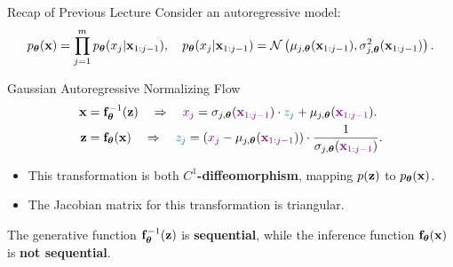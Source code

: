 \documentclass{beamer}
\begin{document}
\begin{frame}{Recap of Previous Lecture}
	Consider an autoregressive model:
	\vspace{-0.3cm}
	{\small
		\[
		p_{\boldsymbol{\theta}}(\mathbf{x}) = \prod_{j=1}^m p_{\boldsymbol{\theta}}(x_j | \mathbf{x}_{1:j - 1}), \quad
		p_{\boldsymbol{\theta}}(x_j | \mathbf{x}_{1:j - 1}) = \mathcal{N} \left(\mu_{j, \boldsymbol{\theta}}(\mathbf{x}_{1:j-1}), \sigma^2_{j, \boldsymbol{\theta}} (\mathbf{x}_{1:j-1})\right).
		\]
	}
	\vspace{-0.5cm}
	\begin{block}{Gaussian Autoregressive Normalizing Flow}
		\vspace{-0.5cm}
		\begin{align*}
			\mathbf{x} &= \mathbf{f}^{-1}_{\boldsymbol{\theta}}(\mathbf{z}) \quad \Rightarrow \quad {\color{violet} x_j} = \sigma_{j, \boldsymbol{\theta}} ({\color{violet} \mathbf{x}_{1:j-1}}) \cdot {\color{teal} z_j} + \mu_{j, \boldsymbol{\theta}}({\color{violet} \mathbf{x}_{1:j-1}}). \\
			\mathbf{z} &= \mathbf{f}_{\boldsymbol{\theta}}(\mathbf{x}) \quad \Rightarrow \quad {\color{teal} z_j} = \left({\color{violet}x_j} - \mu_{j, \boldsymbol{\theta}}({\color{violet}\mathbf{x}_{1:j-1}}) \right) \cdot \frac{1}{ \sigma_{j, \boldsymbol{\theta}} ({\color{violet}\mathbf{x}_{1:j-1}})}.
		\end{align*}
		\vspace{-0.5cm}
	\end{block}
	\begin{itemize}
		\item This transformation is both \textbf{$C^1$-diffeomorphism}, mapping $p(\mathbf{z})$ to $p_{\boldsymbol{\theta}}(\mathbf{x})$.
		\item The Jacobian matrix for this transformation is triangular.
	\end{itemize}
	The generative function $\mathbf{f}^{-1}_{\boldsymbol{\theta}}(\mathbf{z})$ is \textbf{sequential}, while the inference function $\mathbf{f}_{\boldsymbol{\theta}}(\mathbf{x})$ is \textbf{not sequential}.
\end{frame}
\end{document}
